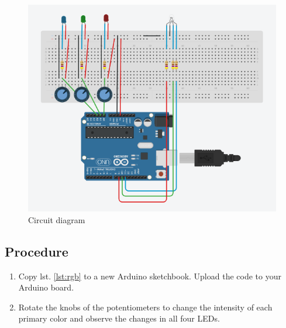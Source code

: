 \begin{figure}[H]
    \centering
    \includegraphics[scale = 0.6]{Figures/light-color-comb.png}
    \caption{Circuit diagram}
\end{figure}

\subsection*{Procedure}
\begin{enumerate}[leftmargin=*]
    \item Copy lst. \ref{lst:rgb} to a new Arduino sketchbook. Upload the code to your Arduino board.
    \item Rotate the knobs of the potentiometers to change the intensity of each primary color and observe the changes in all four LEDs.
\end{enumerate}

